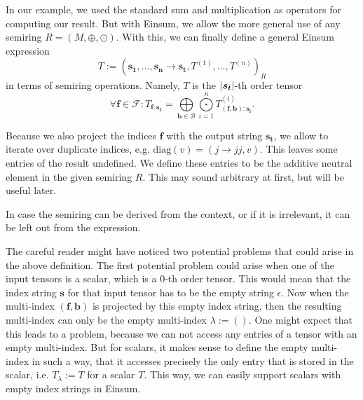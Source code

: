\begin{definition}
    In our example, we used the standard sum and multiplication as operators for computing our result.
    But with Einsum, we allow the more general use of any semiring $R = (M, \oplus, \odot)$.
    With this, we can finally define a general Einsum expression
    $$T := (\bm{s_1},\dots,\bm{s_n} \rightarrow \bm{s_t}, T^{(1)},\dots,T^{(n)})_R$$
    in terms of semiring operations. Namely, $T$ is the $\left\lvert \bm{s_t} \right\rvert$-th order tensor
    $$\forall \bm{f} \in \mathcal{F}: T_{\bm{f}: \bm{s_t}} = \bigoplus\limits_{\bm{b} \in \mathcal{B}} \bigodot\limits_{i = 1}^{n} T^{(i)}_{(\bm{f},\bm{b}):\bm{s_i}}.$$

    Because we also project the indices $\bm{f}$ with the output string $\bm{s_t}$, we allow to iterate over duplicate indices,
    e.g. $\text{diag}(v) = (j \rightarrow jj, v)$.
    This leaves some entries of the result undefined.
    We define these entries to be the additive neutral element in the given semiring $R$.
    This may sound arbitrary at first, but will be useful later.

    In case the semiring can be derived from the context, or if it is irrelevant, it can be left out from the expression.


\end{definition}
\bigskip

The careful reader might have noticed two potential problems that could arise in the above definition.
The first potential problem could arise when one of the input tensors is a scalar, which is a 0-th order tensor.
This would mean that the index string $\bm{s}$ for that input tensor has to be the empty string $\epsilon$.
Now when the multi-index $(\bm{f}, \bm{b})$ is projected by this empty index string, then the resulting multi-index can only be the empty multi-index $\lambda := ()$.
One might expect that this leads to a problem, because we can not access any entries of a tensor with an empty multi-index.
But for scalars, it makes sense to define the empty multi-index in such a way, that it accesses precisely the only entry that is stored in the scalar, i.e. $T_\lambda := T$ for a scalar $T$.
This way, we can easily support scalars with empty index strings in Einsum.

